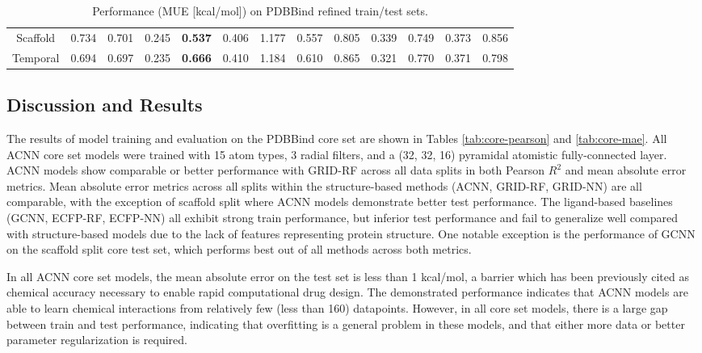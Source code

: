 {\begin{landscape}
\begin{table}[h]
\begin{tabular}{|c||c|c||c|c||c|c||c|c||c|c||c|c|}
    Scaffold & 0.734 & 0.701 & 0.245 & \textbf{0.537} & 0.406 & 1.177 & 0.557 & 0.805 & 0.339 & 0.749 & 0.373 & 0.856 \\
    Temporal & 0.694 & 0.697 & 0.235 & \textbf{0.666} & 0.410 & 1.184 & 0.610 & 0.865 & 0.321 & 0.770 & 0.371 & 0.798 \\
    \hline
    \end{tabular}	
  \caption{Performance (MUE [kcal/mol]) on PDBBind refined train/test sets.}
  \label{tab:refined-mae}
\end{table}
\end{landscape}
\clearpage%
}


\subsection{Discussion and Results}
The results of model training and evaluation on the PDBBind core set are shown in Tables \ref{tab:core-pearson} and \ref{tab:core-mae}.  All ACNN core set models were trained with 15 atom types, 3 radial filters, and a (32, 32, 16) pyramidal atomistic fully-connected layer. ACNN models show comparable or better performance with GRID-RF across all data splits in both Pearson $R^2$ and mean absolute error metrics.  Mean absolute error metrics across all splits within the structure-based methods (ACNN, GRID-RF, GRID-NN) are all comparable, with the exception of scaffold split where ACNN models demonstrate better test performance.  The ligand-based baselines (GCNN, ECFP-RF, ECFP-NN) all exhibit strong train performance, but inferior test performance and fail to generalize well compared with structure-based models due to the lack of features representing protein structure.  One notable exception is the performance of GCNN on the scaffold split core test set, which performs best out of all methods across both metrics.

In all ACNN core set models, the mean absolute error on the test set is less than 1 kcal/mol, a barrier which has been previously cited as chemical accuracy necessary to enable rapid computational drug design.\cite{peterson2012chemical} The demonstrated performance indicates that ACNN models are able to learn chemical interactions from relatively few (less than 160) datapoints. However, in all core set models, there is a large gap between train and test performance, indicating that overfitting is a general problem in these models, and that either more data or better parameter regularization is required.

